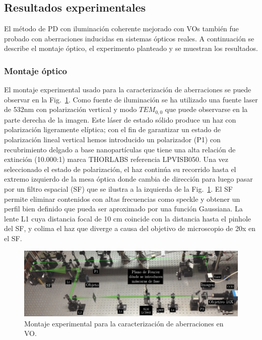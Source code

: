 \subsection{Resultados experimentales}
\label{sec:ChPD_resultados_experimentales}

El método de PD con iluminación coherente mejorado con VOs también fue
probado con aberraciones inducidas en sistemas ópticos reales. A
continuación se describe el montaje óptico, el experimento planteado y
se muestran los resultados. 

\subsubsection{Montaje óptico} 
El montaje experimental usado para la caracterización de aberraciones
se puede observar en la Fig.~\ref{fig:exp_setup}. Como fuente de
iluminación se ha utilizado una fuente laser de 532nm con polarización
vertical y modo $TEM_{0,0}$ que puede observarse en la parte derecha de la imagen. Este
láser de estado sólido produce un haz con polarización ligeramente
elíptica; con el fin de garantizar un estado de polarización lineal
vertical hemos introducido un polarizador (P1) con recubrimiento delgado a
base nanopartículas que tiene una alta relación de
extinción (10.000:1) marca THORLABS referencia LPVISB050. Una vez
seleccionado el estado de polarización, el haz continúa su recorrido 
hasta el extremo izquierdo de la mesa óptica donde cambia de dirección
para luego pasar por un filtro espacial (SF) que se ilustra a la izquierda
de la Fig.~\ref{fig:exp_setup}. El SF permite eliminar
contenidos con altas frecuencias como speckle y obtener un perfil
 bien definido que pueda ser aproximado por una función Gaussiana. La
 lente L1 cuya distancia focal de 10 cm coincide con la distancia hasta
 el pinhole del SF, y colima el haz que diverge a causa del
 objetivo de microscopio de 20x en el SF. 

\begin{figure}[h!]
\centering
\includegraphics[scale=1]{PD_setup_big.pdf}
\caption[Montaje experimental para reconstrucción de fase con PD]{Montaje experimental para la caracterización de aberraciones
en VO.} 
\label{fig:exp_setup}
\end{figure} 

